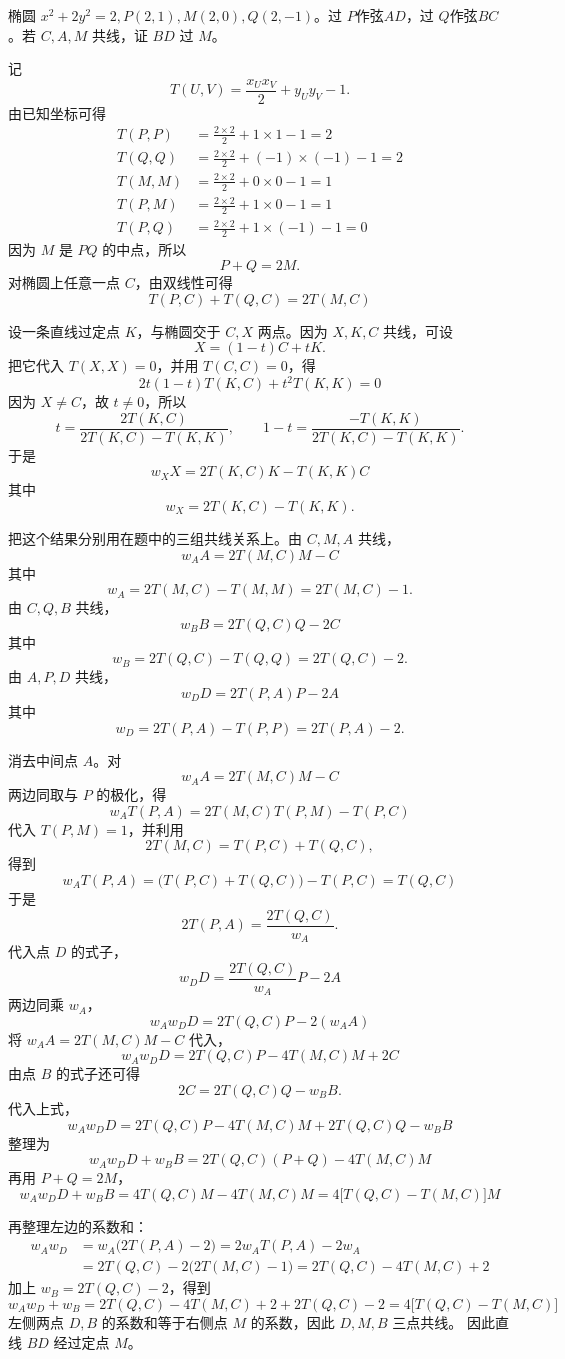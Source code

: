 \begin{exercise}
椭圆 $x^2+2y^2=2, P(2,1), M(2,0), Q(2,-1)$。过 $P$作弦$ AD$，过 $Q$作弦$BC$。若 $C,A,M$ 共线，证 $BD$ 过 $M$。
\end{exercise}
\begin{solution}
记
$$T(U,V) = \frac{x_U x_V}{2} + y_U y_V - 1.$$
由已知坐标可得
\begin{align*}
T(P,P) &= \frac{2 \times 2}{2} + 1 \times 1 - 1 = 2 \\
T(Q,Q) &= \frac{2 \times 2}{2} + (-1) \times (-1) - 1 = 2 \\
T(M,M) &= \frac{2 \times 2}{2} + 0 \times 0 - 1 = 1 \\
T(P,M) &= \frac{2 \times 2}{2} + 1 \times 0 - 1 = 1 \\
T(P,Q) &= \frac{2 \times 2}{2} + 1 \times (-1) - 1 = 0
\end{align*}
因为 $M$ 是 $PQ$ 的中点，所以
$$P + Q = 2M.$$
对椭圆上任意一点 $C$，由双线性可得
$$ T(P,C) + T(Q,C) = 2T(M,C) $$

设一条直线过定点 $K$，与椭圆交于 $C,X$ 两点。因为 $X,K,C$ 共线，可设
$$X = (1-t)C + tK.$$
把它代入 $T(X,X)=0$，并用 $T(C,C)=0$，得
$$ 2t(1-t)T(K,C) + t^2 T(K,K) = 0 $$
因为 $X \neq C$，故 $t \neq 0$，所以
$$t = \frac{2T(K,C)}{2T(K,C) - T(K,K)},\qquad 1-t = \frac{-T(K,K)}{2T(K,C) - T(K,K)}.$$
于是
$$ w_X X = 2T(K,C)K - T(K,K)C $$
其中
$$w_X = 2T(K,C) - T(K,K).$$

把这个结果分别用在题中的三组共线关系上。由 $C,M,A$ 共线，
$$ w_A A = 2T(M,C)M - C $$
其中
$$w_A = 2T(M,C) - T(M,M) = 2T(M,C) - 1.$$
由 $C,Q,B$ 共线，
$$ w_B B = 2T(Q,C)Q - 2C $$
其中
$$w_B = 2T(Q,C) - T(Q,Q) = 2T(Q,C) - 2.$$
由 $A,P,D$ 共线，
$$ w_D D = 2T(P,A)P - 2A $$
其中
$$w_D = 2T(P,A) - T(P,P) = 2T(P,A) - 2.$$

消去中间点 $A$。对
$$w_A A = 2T(M,C)M - C$$
两边同取与 $P$ 的极化，得
$$ w_A T(P,A) = 2T(M,C)T(P,M) - T(P,C) $$
代入 $T(P,M) = 1$，并利用
$$2T(M,C) = T(P,C) + T(Q,C),$$
得到
$$ w_A T(P,A) = \big( T(P,C) + T(Q,C) \big) - T(P,C) = T(Q,C) $$
于是
$$2T(P,A) = \frac{2T(Q,C)}{w_A}.$$
代入点 $D$ 的式子，
$$ w_D D = \frac{2T(Q,C)}{w_A} P - 2A $$
两边同乘 $w_A$，
$$ w_A w_D D = 2T(Q,C)P - 2(w_A A) $$
将 $w_A A = 2T(M,C)M - C$ 代入，
$$ w_A w_D D = 2T(Q,C)P - 4T(M,C)M + 2C $$
由点 $B$ 的式子还可得
$$2C = 2T(Q,C)Q - w_B B.$$
代入上式，
$$ w_A w_D D = 2T(Q,C)P - 4T(M,C)M + 2T(Q,C)Q - w_B B $$
整理为
$$ w_A w_D D + w_B B = 2T(Q,C)(P+Q) - 4T(M,C)M $$
再用 $P+Q = 2M$，
$$ w_A w_D D + w_B B = 4T(Q,C)M - 4T(M,C)M = 4\big[ T(Q,C) - T(M,C) \big]M $$

再整理左边的系数和：
\begin{align*}
w_A w_D &= w_A \big( 2T(P,A) - 2 \big) = 2w_A T(P,A) - 2w_A \\
&= 2T(Q,C) - 2\big( 2T(M,C) - 1 \big) = 2T(Q,C) - 4T(M,C) + 2
\end{align*}
加上 $w_B = 2T(Q,C) - 2$，得到
$$ w_A w_D + w_B = 2T(Q,C) - 4T(M,C) + 2 + 2T(Q,C) - 2 = 4\big[ T(Q,C) - T(M,C) \big] $$
左侧两点 $D,B$ 的系数和等于右侧点 $M$ 的系数，因此 $D,M,B$ 三点共线。
因此直线 $BD$ 经过定点 $M$。
\end{solution}

